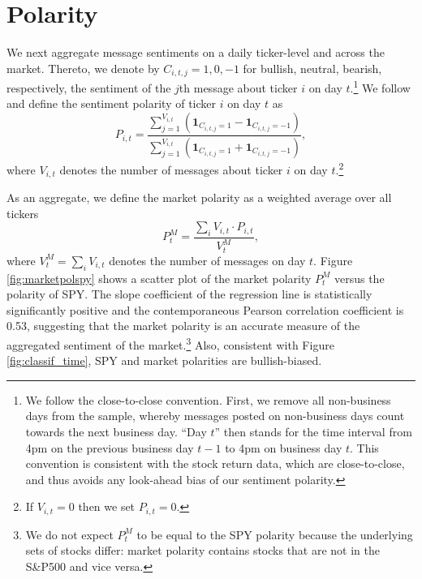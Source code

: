 





\section{Polarity}\label{S:polarity}

We next aggregate message sentiments on a daily ticker-level and across the market. Thereto, we denote by $C_{i,t,j}=1,0,-1$ for bullish, neutral, bearish, respectively, the sentiment of the $j$th message about ticker $i$ on day $t$.\footnote{We follow the close-to-close convention. First, we remove all non-business days from the sample, whereby messages posted on non-business days count towards the next business day. ``Day $t$'' then stands for the time interval from 4pm on the previous business day $t-1$ to 4pm on business day $t$. This convention is consistent with the stock return data, which are close-to-close, and thus avoids any look-ahead bias of our sentiment polarity.} We follow \citet{ranco2015effects} and define the sentiment polarity of ticker $i$ on day $t$ as
\begin{equation}
    P_{i,t} = \dfrac{\sum_{j=1}^{V_{i,t}} (\textbf{1}_{C_{i,t,j} = 1} - \textbf{1}_{C_{i,t,j} = -1})}{\sum_{j=1}^{V_{i,t}} (\textbf{1}_{C_{i,t,j} = 1} + \textbf{1}_{C_{i,t,j} = -1})},
\end{equation}
where $V_{i,t}$ denotes the number of messages about ticker $i$ on day $t$.\footnote{If $V_{i,t}=0$ then we set $P_{i,t} =0$.} 

As an aggregate, we define the market polarity as a weighted average over all tickers 
\begin{equation}
\label{marketpoleq}
    P_t^M = \dfrac{\sum_{i} V_{i,t} \cdot P_{i,t}}{V^M_t} ,
\end{equation}
where $V^M_t = \sum_{i} V_{i,t}$ denotes the number of messages on day $t$. Figure \ref{fig:marketpolspy} shows a scatter plot of the market polarity $P_{t}^M$ versus the polarity of SPY. The slope coefficient of the regression line is statistically significantly positive and the contemporaneous Pearson correlation coefficient is 0.53, suggesting that the market polarity is an accurate measure of the aggregated sentiment of the market.\footnote{We do not expect $P^M_t$ to be equal to the SPY polarity because the underlying sets of stocks differ: market polarity contains stocks that are not in the S\&P500 and vice versa.} Also, consistent with Figure \ref{fig:classif_time}, SPY and market polarities are bullish-biased.


